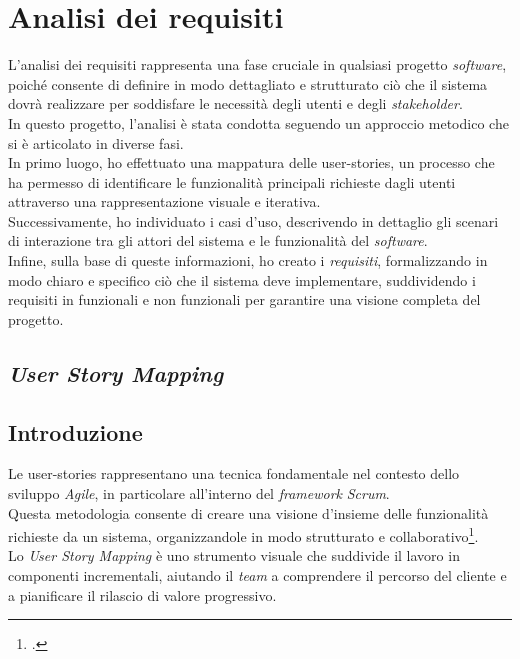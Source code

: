 \pagebreak
\section{Analisi dei requisiti}
\label{sez:analisi-dei-requisiti}
L’analisi dei requisiti rappresenta una fase cruciale in qualsiasi progetto \textit{software}, poiché consente di definire in modo dettagliato e strutturato ciò che il sistema dovrà realizzare per soddisfare le necessità degli utenti e degli \textit{stakeholder}.\\
In questo progetto, l’analisi è stata condotta seguendo un approccio metodico che si è articolato in diverse fasi.\\

\noindent In primo luogo, ho effettuato una mappatura delle \gls{user-stories}, un processo che ha permesso di identificare le funzionalità principali richieste dagli utenti attraverso una rappresentazione visuale e iterativa. \\
Successivamente, ho individuato i casi d’uso, descrivendo in dettaglio gli scenari di interazione tra gli attori del sistema e le funzionalità del \textit{software}.\\
Infine, sulla base di queste informazioni, ho creato i \textit{requisiti}, formalizzando in modo chiaro e specifico ciò che il sistema deve implementare, suddividendo i requisiti in funzionali e non funzionali per garantire una visione completa del progetto.
\subsection{\textit{User Story Mapping}}
\label{subsec:user-story-mapping}

\subsection*{Introduzione}
\label{subsubsec:introduzione}

Le \gls{user-stories} rappresentano una tecnica fondamentale nel contesto dello sviluppo \textit{Agile}, in particolare all'interno del \textit{framework} \textit{Scrum}. \\
Questa metodologia consente di creare una visione d'insieme delle funzionalità richieste da un sistema, organizzandole in modo strutturato e collaborativo\footcite{site:user-stories}. \\

\noindent Lo \textit{User Story Mapping} è uno strumento visuale che suddivide il lavoro in componenti incrementali, aiutando il \textit{team} a comprendere il percorso del cliente e a pianificare il rilascio di valore progressivo.\\


